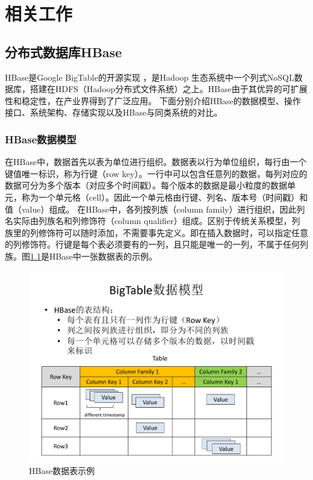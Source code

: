 
\chapter{相关工作}  \label{chap:related}
\section{分布式数据库HBase}
HBase是Google BigTable\supercite{bigtable}的开源实现 ，是Hadoop 生态系统中一个列式NoSQL数据库，搭建在HDFS（Hadoop分布式文件系统）之上。HBase由于其优异的可扩展性和稳定性，在产业界得到了广泛应用。
下面分别介绍HBase的数据模型、操作接口、系统架构、存储实现以及HBase与同类系统的对比。

\subsection{HBase数据模型}
在HBase中，数据首先以表为单位进行组织。数据表以行为单位组织，每行由一个键值唯一标识，称为行键（row key）。一行中可以包含任意列的数据，每列对应的数据可分为多个版本（对应多个时间戳）。每个版本的数据是最小粒度的数据单元，称为一个单元格（cell）。因此一个单元格由行键、列名、版本号（时间戳）和值（value）组成。
在HBase中，各列按列族（column family）进行组织，因此列名实际由列族名和列修饰符（column qualifier）组成。区别于传统关系模型，列族里的列修饰符可以随时添加，不需要事先定义。即在插入数据时，可以指定任意的列修饰符。行键是每个表必须要有的一列，且只能是唯一的一列，不属于任何列族。图\ref{fig:hbase_table}是HBase中一张数据表的示例。

\begin{figure}[htbp]
\centering
\includegraphics[width=120mm]{fig/HBase_table_example.pdf}
\caption{HBase数据表示例}
\label{fig:hbase_table}
\end{figure}

